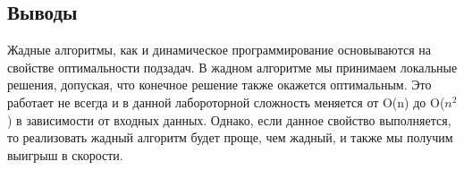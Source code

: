\documentclass[12pt]{article}
\begin{document}
\subsection*{Выводы}

Жадные алгоритмы, как и динамическое программирование основываются на свойстве оптимальности подзадач. В жадном алгоритме мы принимаем локальные решения, допуская, что конечное решение также окажется оптимальным. Это работает не всегда и в данной лабороторной сложность меняется от O(n) до O($n^2$) в зависимости от входных данных. Однако, если данное свойство выполняется, то реализовать жадный алгоритм будет проще, чем жадный, и также мы получим выигрыш в скорости.
\end{document}
